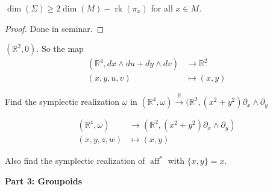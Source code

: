 \begin{lemma}
\(\dim (\Sigma) \geq  2 \dim (M) -
\operatorname{rk}(\pi_x)\) for all \(x \in
M\).
\end{lemma}

\begin{proof}
Done in seminar.
\end{proof}

\begin{example}
\((\mathbb{R}^2,0)\). So the map
$$
\begin{aligned}
	(\mathbb{R}^4,dx \wedge du + dy \wedge dv)
	&\longrightarrow  \mathbb{R}^2\\
	(x,y,u,v) &\longmapsto (x,y)
\end{aligned}
$$

\end{example}

\begin{exercise}
Find the symplectic realization \(\omega\) in
\((\mathbb{R}^4, \omega )
\xrightarrow{\mu}(\mathbb{R}^2,(x^2+y^2)
\partial_x
\wedge \partial_y\)

$$
\begin{aligned}
	(\mathbb{R}^4, \omega) &\longrightarrow
	(\mathbb{R}^2,(x^2+y^2) \partial_x \wedge
	\partial _y) \\
	(x,y,z,w) &\longmapsto (x,y)
\end{aligned}
$$

Also find the symplectic realization of
\(\operatorname{ a f f }^*\) with
\(\{x,y\}=x\).
\end{exercise}

\medskip\noindent
{\bf Part 3: Groupoids}

